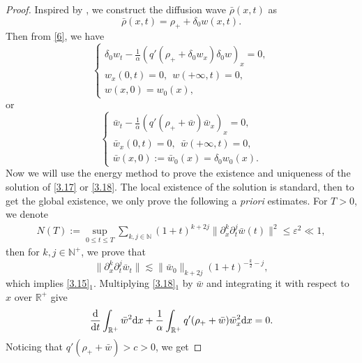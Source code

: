 \documentclass[11pt]{article}
\theoremstyle{plain}
\numberwithin{equation}{section}
\begin{document}
\begin{proof}
Inspired by \cite{Mei2005}, we construct the diffusion wave $\bar\rho(x,t)$ as
\begin{equation}\label{3.16}
\bar\rho(x,t)=\rho_++\delta_{0}w(x,t).
\end{equation}
Then from \eqref{6}, we have 
 \begin{equation}\label{3.17}
 	\left\{
		\begin{array}{lr}
			\delta_{0}w_t-\displaystyle\frac{1}{\alpha}(q'(\rho_++\delta_{0}w_x)\delta_{0}w)_{x}=0,     \\[2mm]
			w_x(0,t)=0,\ \ w(+\infty,t)=0, \\[2mm]
			w(x,0)=w_0(x),
		\end{array}
		\right.
 \end{equation}
 or 
 \begin{equation}\label{3.18}
 	\left\{
		\begin{array}{lr}
			\bar w_t-\displaystyle\frac{1}{\alpha}(q'(\rho_++\bar w)\bar w_x)_{x}=0,     \\[2mm]
			\bar w_x(0,t)=0,\ \ \bar w(+\infty,t)=0, \\[2mm]
			\bar w(x,0):=\bar w_0(x)=\delta_{0}w_0(x).
		\end{array}
		\right.
 \end{equation}
 Now we will use the energy method to prove the existence and uniqueness of the solution of \eqref{3.17} or \eqref{3.18}.
 The local existence of the solution is standard, then to get the global existence,
we only prove the following a {\it priori} estimates.
For $T>0$, we denote
\begin{align}\label{3.19}
N(T):= \sup \limits_{0 \leq t \leq T}\sum_{k,j\in \mathbb{N}}(1+t)^{k+2j}\|\partial_{x}^{k}\partial_{t}^{j} \bar w(t)\|^{2}\leq \varepsilon^{2}\ll1,
\end{align}
then for $k,j\in \mathbb{N}^+$, we prove that
\begin{equation}\label{3.19a}
\|\partial_x^k\partial_t^j\bar w_{t}\|\lesssim\|\bar w_{0}\|_{k+2j}(1+t)^{-\frac{k}{2}-j},	
\end{equation}
which implies \eqref{3.15}$_1$.
Multiplying \eqref{3.18}$_1$ by $\bar w$ and integrating it with respect to $x$ over $\mathbb{R}^+$ give
\begin{equation}\notag
 \frac{{\rm d}}{{\rm d}t}\int_{\mathbb{R}^+} \bar{w}^2{\rm d} x+\frac{1}{\alpha}\int_{\mathbb{R}^+} q'(\rho_++\bar w)\bar w_{x}^{2}{\rm d}x =0.
\end{equation}
Noticing that $q'(\rho_++\bar w)>c>0$, we get

\end{proof}
\end{document}
